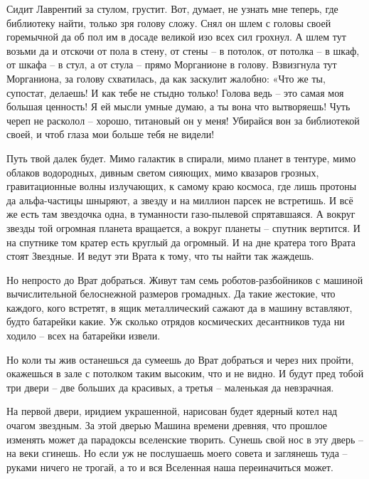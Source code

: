 \documentclass[ebook,oneside,final,openright]{memoir}
\begin{document}
\par
Сидит Лаврентий за стулом, грустит. Вот, думает, не узнать мне теперь, где библиотеку найти, только зря голову сложу. Снял он шлем с головы своей горемычной да об пол им в досаде великой изо всех сил грохнул. А шлем тут возьми да и отскочи от пола в стену, от стены – в потолок, от потолка – в шкаф, от шкафа – в стул, а от стула – прямо Морганионе в голову. Взвизгнула тут Морганиона, за голову схватилась, да как заскулит жалобно: «Что же ты, супостат, делаешь! И как тебе не стыдно только! Голова ведь – это самая моя большая ценность! Я ей мысли умные думаю, а ты вона что вытворяешь! Чуть череп не расколол – хорошо, титановый он у меня! Убирайся вон за библиотекой своей, и чтоб глаза мои больше тебя не видели!\par
\par
Путь твой далек будет. Мимо галактик в спирали, мимо планет в тентуре, мимо облаков водородных, дивным светом сияющих, мимо квазаров грозных, гравитационные волны излучающих, к самому краю космоса, где лишь протоны да альфа-частицы шныряют, а звезду и на миллион парсек не встретишь. И всё же есть там звездочка одна, в туманности газо-пылевой спрятавшаяся. А вокруг звезды той огромная планета вращается, а вокруг планеты – спутник вертится. И на спутнике том кратер есть круглый да огромный. И на дне кратера того Врата стоят Звездные. И ведут эти Врата к тому, что ты найти так жаждешь.\par
\par
Но непросто до Врат добраться. Живут там семь роботов-разбойников с машиной вычислительной белоснежной размеров громадных. Да такие жестокие, что каждого, кого встретят, в ящик металлический сажают да в машину вставляют, будто батарейки какие. Уж сколько отрядов космических десантников туда ни ходило – всех на батарейки извели.\par
\par
Но коли ты жив останешься да сумеешь до Врат добраться и через них пройти, окажешься в зале с потолком таким высоким, что и не видно. И будут пред тобой три двери – две больших да красивых, а третья – маленькая да невзрачная.\par
\par
На первой двери, иридием украшенной, нарисован будет ядерный котел над очагом звездным. За этой дверью Машина времени древняя, что прошлое изменять может да парадоксы вселенские творить. Сунешь свой нос в эту дверь – на веки сгинешь. Но если уж не послушаешь моего совета и заглянешь туда – руками ничего не трогай, а то и вся Вселенная наша переиначиться может.\par
\end{document}
